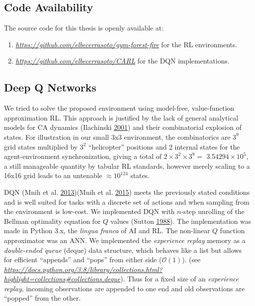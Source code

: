 \documentclass[
  12pt,
  openany]{book}
\providecommand{\tightlist}{%
  \setlength{\itemsep}{0pt}\setlength{\parskip}{0pt}}
\begin{document}
\hypertarget{code-availability}{%
\subsection{Code Availability}\label{code-availability}}

The source code for this thesis is openly available at:

\begin{enumerate}
\def\labelenumi{\arabic{enumi}.}
\tightlist
\item
  \emph{\url{https://github.com/elbecerrasoto/gym-forest-fire}} for the RL environments.
\item
  \emph{\url{https://github.com/elbecerrasoto/CARL}} for the DQN implementations.
\end{enumerate}

\hypertarget{deep-q-networks-1}{%
\subsection{Deep Q Networks}\label{deep-q-networks-1}}

We tried to solve the proposed environment using model-free, value-function approximation RL. This approach is justified by the lack of general analytical models for CA dynamics (Ilachinski \protect\hyperlink{ref-ilachinski2001cellular}{2001}) and their combinatorial explosion of states. For illustration in our small 3x3 environment, the combinatorics are \(3^9\) grid states multiplied by \(3^2\) ``helicopter'' positions and \(2\) internal states for the agent-environment synchronization, giving a total of \(2 \times 3^2 \times 3^9 =\) \ensuremath{3.54294\times 10^{5}}, a still manageable quantity by tabular RL standards, however merely scaling to a 16x16 grid leads to an untenable \(\approx 10^{124}\) states.

DQN (Mnih et al. \protect\hyperlink{ref-mnih2013playing}{2013})(Mnih et al. \protect\hyperlink{ref-mnih2015human}{2015}) meets the previously stated conditions and is well suited for tasks with a discrete set of actions and when sampling from the environment is low-cost. We implemented DQN with \(n\)-step unrolling of the Bellman optimality equation for \(Q\) values (Sutton \protect\hyperlink{ref-sutton1988learning}{1988}). The implementation was made in Python 3.x, the \emph{lingua franca} of AI and RL. The non-linear \(Q\) function approximator was an ANN. We implemented the \emph{experience replay} memory as a \emph{double-ended queue} (deque) data structure, which behaves like a list but allows for efficient ``appends'' and ``pops'' from either side (\(\mathcal{O}(1)\)). (see \emph{\url{https://docs.python.org/3.8/library/collections.html?highlight=collections\#collections.deque}}). Thus for a fixed size of an \emph{experience replay}, incoming observations are appended to one end and old observations are ``popped'' from the other.
\end{document}
